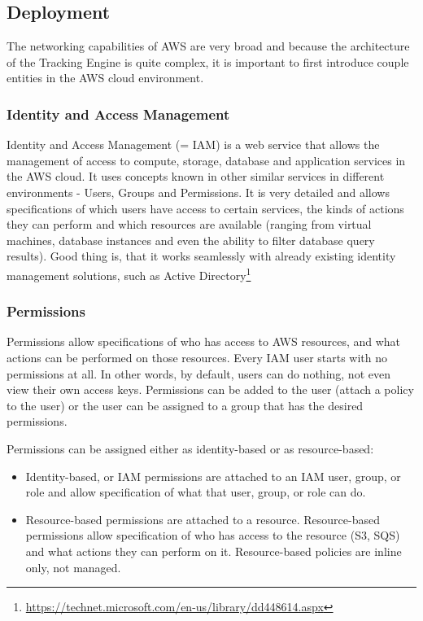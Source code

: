 \subsection{Deployment}

The networking capabilities of AWS are very broad and because the architecture of the Tracking Engine is quite complex, it is important to first introduce couple entities in the AWS cloud environment.

\subsubsection*{Identity and Access Management}

Identity and Access Management (= IAM) is a web service that allows the management of access to compute, storage, database and application services in the AWS cloud. It uses concepts known in other similar services in different environments - Users, Groups and Permissions. It is very detailed and allows specifications of which users have access to certain services, the kinds of actions they can perform and which resources are available (ranging from virtual machines, database instances and even the ability to filter database query results). Good thing is, that it works seamlessly with already existing identity management solutions, such as Active Directory\footnote{\url{https://technet.microsoft.com/en-us/library/dd448614.aspx}}

\subsubsection*{Permissions}

Permissions allow specifications of who has access to AWS resources, and what actions can be performed on those resources. Every IAM user starts with no permissions at all. In other words, by default, users can do nothing, not even view their own access keys. Permissions can be added to the user (attach a policy to the user) or the user can be assigned to a group that has the desired permissions.

\newpage

Permissions can be assigned either as identity-based or as resource-based:

\begin{itemize}
	\item Identity-based, or IAM permissions are attached to an IAM user, group, or role and allow specification of what that user, group, or role can do.
	\item Resource-based permissions are attached to a resource. Resource-based permissions allow specification of who has access to the resource (S3, SQS) and what actions they can perform on it. Resource-based policies are inline only, not managed.
\end{itemize}

